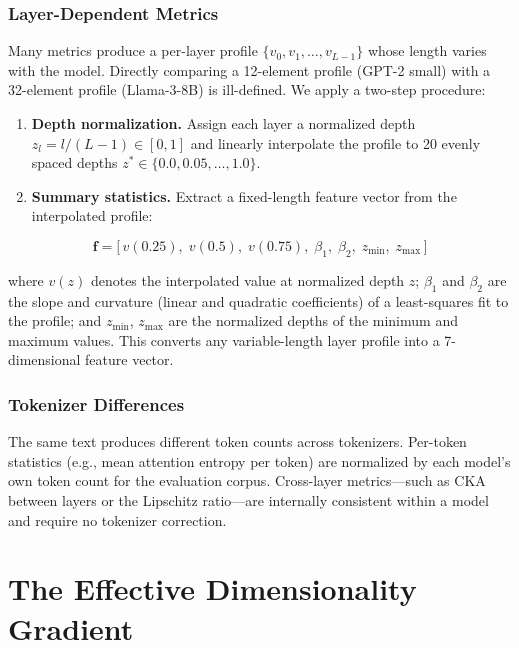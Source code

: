 \documentclass{article}
\begin{document}
\subsubsection{Layer-Dependent Metrics}
\label{sec:norm-layer}

Many metrics produce a per-layer profile $\{v_0, v_1, \ldots, v_{L-1}\}$ whose length varies with the model.
Directly comparing a 12-element profile (GPT-2 small) with a 32-element profile (Llama-3-8B) is ill-defined.
We apply a two-step procedure:

\begin{enumerate}
  \item \textbf{Depth normalization.} Assign each layer a normalized depth $z_l = l / (L-1) \in [0, 1]$ and linearly interpolate the profile to 20 evenly spaced depths $z^* \in \{0.0, 0.05, \ldots, 1.0\}$.
  \item \textbf{Summary statistics.} Extract a fixed-length feature vector from the interpolated profile:
\end{enumerate}

\begin{equation}
  \mathbf{f} = \bigl[\, v(0.25),\; v(0.5),\; v(0.75),\; \beta_1,\; \beta_2,\; z_{\min},\; z_{\max} \,\bigr]
  \label{eq:layer-features}
\end{equation}

\noindent where $v(z)$ denotes the interpolated value at normalized depth $z$; $\beta_1$ and $\beta_2$ are the slope and curvature (linear and quadratic coefficients) of a least-squares fit to the profile; and $z_{\min}$, $z_{\max}$ are the normalized depths of the minimum and maximum values.
This converts any variable-length layer profile into a 7-dimensional feature vector.

\subsubsection{Tokenizer Differences}
\label{sec:norm-tok}

The same text produces different token counts across tokenizers.
Per-token statistics (e.g., mean attention entropy per token) are normalized by each model's own token count for the evaluation corpus.
Cross-layer metrics---such as CKA between layers or the Lipschitz ratio---are internally consistent within a model and require no tokenizer correction.

\section{The Effective Dimensionality Gradient}
\label{sec:edg}
\end{document}
